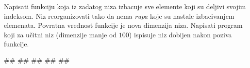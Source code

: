 \begin{Exercise}[label=vp.bez_resenja_2] 
Napisati funkciju koja iz zadatog niza izbacuje sve elemente koji su deljivi svojim indeksom. Niz reorganizovati tako da nema \emph{rupa} koje su nastale izbacivanjem elemenata. Povratna vrednost funkcije je nova dimenzija niza. Napisati program koji za učitni niz (dimenzije manje od $100$) ispisuje niz dobijen nakon poziva funkcije. %



\begin{miditest}
\begin{upotreba}{1}
#\naslovInt#
##
##
##
##
\end{upotreba}
\end{miditest}
\end{Exercise}
\begin{Answer}[ref=vp.bez_resenja_2]
\end{Answer}





